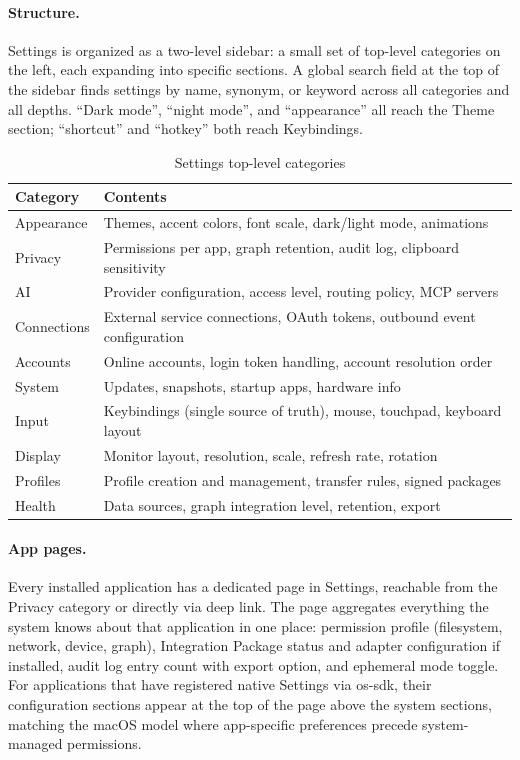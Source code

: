 \paragraph{Structure.}
Settings is organized as a two-level sidebar: a small set of top-level
categories on the left, each expanding into specific sections. A global search
field at the top of the sidebar finds settings by name, synonym, or keyword
across all categories and all depths. ``Dark mode'', ``night mode'', and
``appearance'' all reach the Theme section; ``shortcut'' and ``hotkey'' both
reach Keybindings.

\begin{table}[htbp]
\caption{Settings top-level categories}
\label{tab:settings-categories}
\begin{tabularx}{\linewidth}{lX}
\toprule
\textbf{Category} & \textbf{Contents} \\
\midrule
Appearance    & Themes, accent colors, font scale, dark/light mode, animations \\
Privacy       & Permissions per app, graph retention, audit log, clipboard sensitivity \\
AI            & Provider configuration, access level, routing policy, MCP servers \\
Connections   & External service connections, OAuth tokens, outbound event configuration \\
Accounts      & Online accounts, login token handling, account resolution order \\
System        & Updates, snapshots, startup apps, hardware info \\
Input         & Keybindings (single source of truth), mouse, touchpad, keyboard layout \\
Display       & Monitor layout, resolution, scale, refresh rate, rotation \\
Profiles      & Profile creation and management, transfer rules, signed packages \\
Health        & Data sources, graph integration level, retention, export \\
\bottomrule
\end{tabularx}
\end{table}

\paragraph{App pages.}
Every installed application has a dedicated page in Settings, reachable from
the Privacy category or directly via deep link. The page aggregates everything
the system knows about that application in one place: permission profile
(filesystem, network, device, graph), Integration Package status and adapter
configuration if installed, audit log entry count with export option, and
ephemeral mode toggle. For applications that have registered native Settings
via os-sdk, their configuration sections appear at the top of the page above
the system sections, matching the macOS model where app-specific preferences
precede system-managed permissions.

